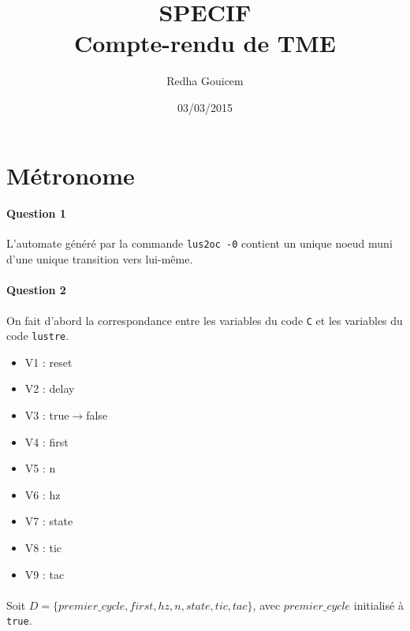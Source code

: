 \documentclass[a4paper, 11pt]{article}
\begin{document}
 
\title{SPECIF\\Compte-rendu de TME}
\author{Redha Gouicem}
\date{03/03/2015}
 
\maketitle
 
\section{Métronome}
\paragraph{Question 1}
L'automate généré par la commande \texttt{lus2oc -0} contient un unique noeud muni d'une unique transition vers 
lui-même. 

\paragraph{Question 2}
On fait d'abord la correspondance entre les variables du code \texttt{C} et les variables du code 
\texttt{lustre}.
\begin{itemize}
  \item V1 : reset
  \item V2 : delay
  \item V3 : true$\rightarrow$false
  \item V4 : first
  \item V5 : n
  \item V6 : hz
  \item V7 : state
  \item V8 : tic
  \item V9 : tac
\end{itemize}

\paragraph{}
Soit $D = \{premier\_cycle, first, hz, n, state, tic, tac\}$, avec $premier\_cycle$ initialisé à \texttt{true}.
\end{document}
